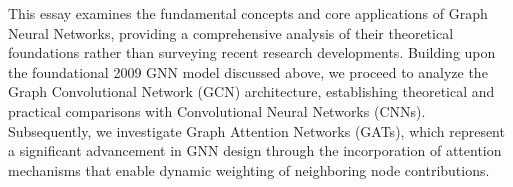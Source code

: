 \documentclass{article}
\begin{document}
This essay examines the fundamental concepts and core applications of Graph Neural Networks, providing a comprehensive analysis of their theoretical foundations rather than surveying recent research developments.
Building upon the foundational 2009 GNN model discussed above, we proceed to analyze the Graph Convolutional Network (GCN) architecture, establishing theoretical and practical comparisons with Convolutional Neural Networks (CNNs). Subsequently, we investigate Graph Attention Networks (GATs), which represent a significant advancement in GNN design through the incorporation of attention mechanisms that enable dynamic weighting of neighboring node contributions.




\end{document}
